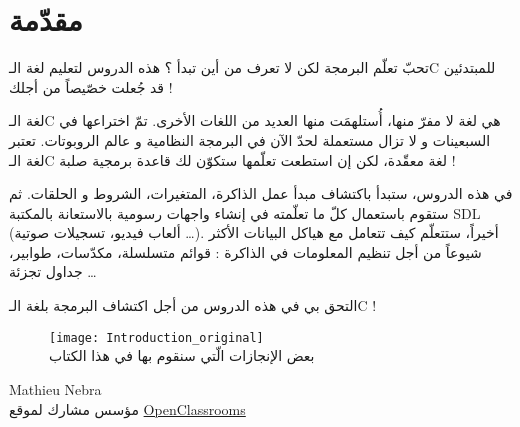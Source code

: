 \chapter*{مقدّمة}

\vspace{-0.6em}
تحبّ تعلّم البرمجة لكن لا تعرف من أين تبدأ ؟ هذه الدروس لتعليم لغة الـ\textenglish{C}
للمبتدئين قد جُعلت خصّيصاً من أجلك !

\vspace{-0.1em}
لغة الـ\textenglish{C}
هي لغة لا مفرّ منها، أُستلهمَت منها العديد من اللغات الأخرى. تمّ اختراعها في السبعينات و لا تزال مستعملة لحدّ الآن في البرمجة النظامية و عالم الروبوتات. تعتبر لغة الـ\textenglish{C}
لغة معقّدة، لكن إن استطعت تعلّمها ستكوّن لك قاعدة برمجية صلبة !

\vspace{-0.1em}
في هذه الدروس، ستبدأ باكتشاف مبدأ عمل الذاكرة، المتغيرات، الشروط و الحلقات. ثم ستقوم باستعمال كلّ ما تعلّمته في إنشاء واجهات رسومية بالاستعانة بالمكتبة
\textenglish{SDL}
 (ألعاب فيديو، تسجيلات صوتية \dots). أخيراً، ستتعلّم كيف تتعامل مع هياكل البيانات الأكثر شيوعاً من أجل تنظيم المعلومات في الذاكرة : قوائم متسلسلة، مكدّسات، طوابير، جداول تجزئة \dots

\vspace{-0.1em}
التحق بي في هذه الدروس من أجل اكتشاف البرمجة بلغة الـ\textenglish{C} !

\begin{figure}[H]
	\centering
	\texttt{[image: Introduction\_original]}\\
\small بعض الإنجازات الّتي سنقوم بها في هذا الكتاب
\end{figure}

\vfill
\hfill\parbox{0.3\textwidth}{\centering \textenglish{Mathieu Nebra}\\[0.2em]
مؤسس مشارك لموقع
\href{http://openclassrooms.com/}{\textenglish{OpenClassrooms}}
}
